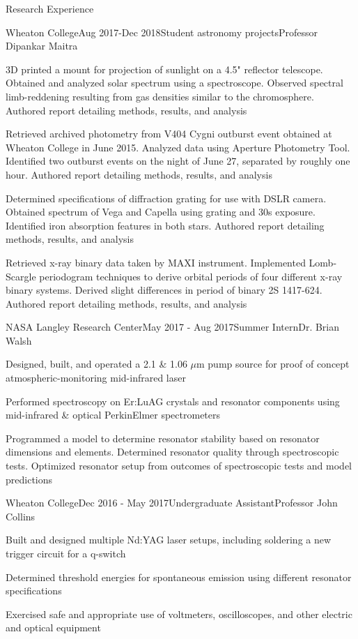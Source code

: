 \documentclass{resume} %
\begin{document}
\begin{rSection}{Research Experience}
\begin{rSubsection}{Wheaton College}{Aug 2017-Dec 2018}{Student astronomy projects}{Professor Dipankar Maitra}
\item 3D printed a mount for projection of sunlight on a 4.5" reflector telescope. Obtained and analyzed solar spectrum using a spectroscope. Observed spectral limb-reddening resulting from gas densities similar to the chromosphere. Authored report detailing methods, results, and analysis
\item Retrieved archived photometry from V404 Cygni outburst event obtained at Wheaton College in June 2015. Analyzed data using Aperture Photometry Tool. Identified two outburst events on the night of June 27, separated by roughly one hour. Authored report detailing methods, results, and analysis
\item Determined specifications of diffraction grating for use with DSLR camera. Obtained spectrum of Vega and Capella using grating and 30s exposure. Identified iron absorption features in both stars. Authored report detailing methods, results, and analysis
\item Retrieved x-ray binary data taken by MAXI instrument. Implemented Lomb-Scargle periodogram techniques to derive orbital periods of four different x-ray binary systems. Derived slight differences in period of binary 2S 1417-624. Authored report detailing methods, results, and analysis
\end{rSubsection}

\begin{rSubsection}{NASA Langley Research Center}{May 2017 - Aug 2017}{Summer Intern}{Dr. Brian Walsh}
\item Designed, built, and operated a 2.1 \& 1.06 $\mu$m pump source for proof of concept atmospheric-monitoring mid-infrared laser
\item Performed spectroscopy on Er:LuAG crystals and resonator components using mid-infrared \& optical PerkinElmer spectrometers
\item Programmed a model to determine resonator stability based on resonator dimensions and elements. Determined resonator quality through spectroscopic tests. Optimized resonator setup from outcomes of spectroscopic tests and model predictions
\end{rSubsection}

\begin{rSubsection}{Wheaton College}{Dec 2016 - May 2017}{Undergraduate Assistant}{Professor John Collins}
\item Built and designed multiple Nd:YAG laser setups, including soldering a new trigger circuit for a q-switch
\item Determined threshold energies for spontaneous emission using different resonator specifications
\item Exercised safe and appropriate use of voltmeters, oscilloscopes, and other electric and optical equipment
\end{rSubsection}

\end{rSection}
\end{document}
